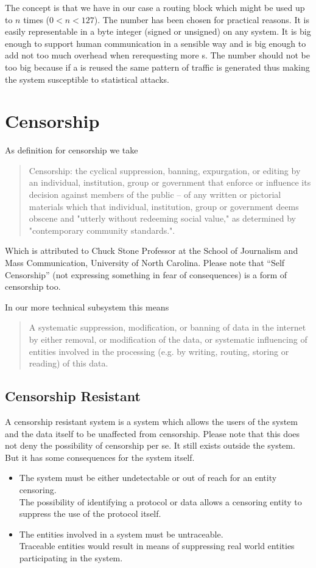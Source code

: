 The concept is that we have in our case a routing block which might be used up to $n$ times ($0<n<127$). The number has been chosen for practical reasons. It is easily representable in a byte integer (signed or unsigned) on any system. It is big enough to support human communication in a sensible way and is big enough to add not too much overhead when rerequesting more s. The number should not be too big because if a  is reused the same pattern of traffic is generated thus making the system susceptible to statistical attacks.

\section{Censorship}
As definition for censorship we take
\begin{quote}
	Censorship: the cyclical suppression, banning, expurgation, or editing by an individual, institution, group or government that enforce or influence its decision against members of the public -- of any written or pictorial materials which that individual, institution, group or government deems obscene and "utterly without redeeming social value," as determined by "contemporary community standards.".
\end{quote}
Which is attributed to Chuck Stone Professor at the School of Journalism and Mass Communication, University of North Carolina. Please note that ``Self Censorship'' (not expressing something in fear of consequences) is a form of censorship too.

In our more technical subsystem this means
\begin{quote}
	A systematic suppression, modification, or banning of data in the internet by either removal, or modification of the data, or systematic influencing of entities involved in the processing (e.g. by writing, routing, storing or reading) of this data.
\end{quote}

\subsection{Censorship Resistant}
A censorship resistant system is a system which allows the users of the system and the data itself to be unaffected from censorship. Please note that this does not deny the possibility of censorship per se. It still exists outside the system. But it has some consequences for the system itself.

\begin{itemize}
	\item The system must be either undetectable or out of reach for an entity censoring.\\
	The possibility of identifying a protocol or data allows a censoring entity to suppress the use of the protocol itself. 
	\item The entities involved in a system must be untraceable.\\
	Traceable entities would result in means of suppressing real world entities participating in the system.
\end{itemize}

